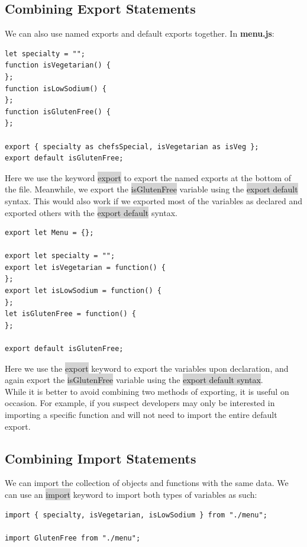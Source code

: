 \documentclass[11pt]{article}
\begin{document}
\subsection{Combining Export Statements}
We can also use named exports and default exports together. In \textbf{menu.js}:
\begin{lstlisting}
let specialty = "";
function isVegetarian() {
}; 
function isLowSodium() {
}; 
function isGlutenFree() {
};

export { specialty as chefsSpecial, isVegetarian as isVeg };
export default isGlutenFree;
\end{lstlisting}
Here we use the keyword \colorbox{lightgray}{export} to export the named exports at the bottom of the file. Meanwhile, we export the \colorbox{lightgray}{isGlutenFree} variable using the \colorbox{lightgray}{export default} syntax. This would also work if we exported most of the variables as declared and exported others with the \colorbox{lightgray}{export default} syntax.
\begin{lstlisting}
export let Menu = {};

export let specialty = "";
export let isVegetarian = function() {
}; 
export let isLowSodium = function() {
}; 
let isGlutenFree = function() {
};

export default isGlutenFree;
\end{lstlisting}
Here we use the \colorbox{lightgray}{export} keyword to export the variables upon declaration, and again export the \colorbox{lightgray}{isGlutenFree} variable using the \colorbox{lightgray}{export default syntax}. \\
\newline
While it is better to avoid combining two methods of exporting, it is useful on occasion. For example, if you suspect developers may only be interested in importing a specific function and will not need to import the entire default export.

\subsection{Combining Import Statements}
We can import the collection of objects and functions with the same data. We can use an \colorbox{lightgray}{import} keyword to import both types of variables as such:
\begin{lstlisting}
import { specialty, isVegetarian, isLowSodium } from "./menu";

import GlutenFree from "./menu";
\end{lstlisting}
\end{document}

